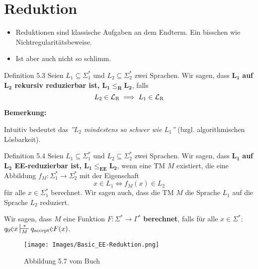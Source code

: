             
            
            
            \section{Reduktion}
            
            \begin{itemize}
                \item Reduktionen sind klassische Aufgaben an dem Endterm. Ein bisschen wie Nichtregularitätsbeweise.
                \item Ist aber auch nicht so schlimm.
            \end{itemize}
        
        
        
            \begin{mainbox}{Definition 5.3}
                Seien $L_1 \subseteq \Sigma_{1}^*$ und $L_2 \subseteq \Sigma_{2}^*$ zwei Sprachen. Wir sagen, dass $\mathbf{L_1}$ \textbf{auf $\mathbf{L_2}$ rekursiv reduzierbar ist, $\mathbf{L_1 \leq_{\textbf{R}} L_2}$}, falls
                $$L_2 \in \mathcal{L}_\text{R} \implies L_1 \in \mathcal{L}_\text{R}$$
            \end{mainbox}
            \textbf{Bemerkung:}
        
            Intuitiv bedeutet das \textit{''$L_2$ mindestens so schwer wie $L_1$''} (bzgl. algorithmischen Lösbarkeit).
        
        
        
            \begin{mainbox}{Definition 5.4}
                Seien $L_1 \subseteq \Sigma_{1}^*$ und $L_2 \subseteq \Sigma_{2}^*$ zwei Sprachen. 
                Wir sagen, dass $\mathbf{L_1}$ \textbf{auf $\mathbf{L_2}$ EE-reduzierbar ist, $\mathbf{L_1 \leq_{\textbf{EE}} L_2}$}, wenn eine TM $M$ existiert, 
                die eine Abbildung $f_M: \Sigma_1^* \to \Sigma_2^*$ mit der Eigenschaft
                $$x \in L_1 \iff f_M(x) \in L_2$$
                für alle $x \in \Sigma_1^*$ berechnet. Wir sagen auch, dass die TM $M$ die Sprache $L_1$ auf die Sprache $L_2$ reduziert.
            \end{mainbox}
            
            \begin{subbox}{}
                Wir sagen, dass $M$ eine Funktion $F: \Sigma^* \to \Gamma^*$ \textbf{berechnet}, 
                falls für alle $x \in \Sigma^*$: $q_0\cent x \sststile{M}{*} q_{\text{accept}}\cent F(x)$.
            \end{subbox}
            \begin{figure}[htp]
                \texttt{[image: Images/Basic\_EE-Reduktion.png]}
                \caption{Abbildung 5.7 vom Buch}
            \end{figure}
        
